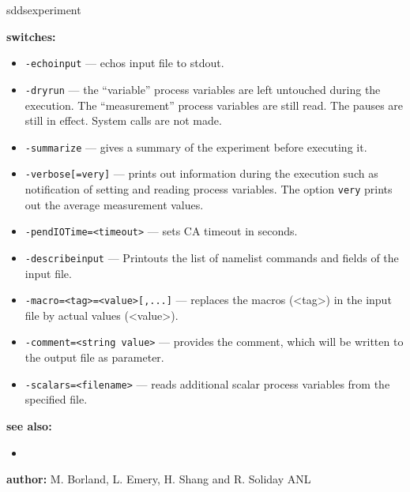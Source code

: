 \begin{sddsprog}{sddsexperiment}
\item \textbf{switches:}
    \begin{itemize}
    \item {\verb+-echoinput+} --- echos input file to stdout.
    \item {\verb+-dryrun+} --- the ``variable'' process variables are left untouched during the execution. The ``measurement''
                process variables are still read. The pauses are still in effect. System calls are not made.
    \item {\verb+-summarize+} --- gives a summary of the experiment before executing it.
    \item {\verb+-verbose[=very]+} --- prints out information during the execution such as notification of 
                setting and reading process variables. The option \verb+very+ prints out the average measurement values.
    \item {\verb+-pendIOTime=<timeout>+} --- sets CA timeout in seconds.
    \item {\verb+-describeinput+} --- Printouts the list of namelist commands and fields of the input file.
    \item {\verb+-macro=<tag>=<value>[,...]+} --- replaces the macros (<tag>) in the input file by actual values (<value>).
    \item {\verb+-comment=<string value>+} --- provides the comment, which will be written to the output file as parameter.
    \item {\verb+-scalars=<filename>+} --- reads additional scalar process variables from the specified file.
    \end{itemize}

\item \textbf{see also:}
    \begin{itemize}
    \item {}
    \end{itemize}
\item \textbf{author:} M. Borland, L. Emery, H. Shang and R. Soliday ANL 
\end{sddsprog}
